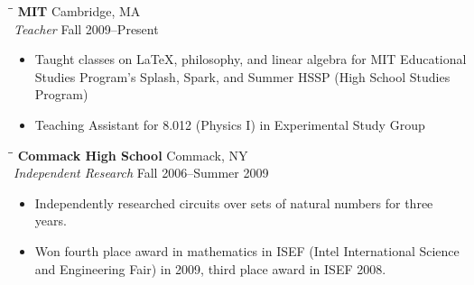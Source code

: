 \documentclass[11pt]{res}
\begin{document}
\begin{resume}
    
   \begin{tabbing}
   \hspace{2.3in}\= \hspace{2.6in}\= \kill %
    {\bf MIT} \>     \> Cambridge, MA \\
    \emph{Teacher} \>                         \>Fall 2009--Present
   \end{tabbing}%
   \begin{itemize}
      \item Taught classes on \LaTeX, philosophy, and linear algebra for MIT Educational Studies Program's Splash, Spark, and Summer HSSP (High School Studies Program)
      \item Teaching Assistant for 8.012 (Physics I) in Experimental Study Group
    \end{itemize}
   \begin{tabbing}
   \hspace{2.3in}\= \hspace{2.6in}\= \kill %
    {\bf Commack High School} \>     \>Commack, NY\\
    \emph{Independent Research} \>                         \>Fall 2006--Summer 2009
   \end{tabbing}%
   \begin{itemize}
      \item Independently researched circuits over sets of natural numbers for three years.
      \item Won fourth place award in mathematics in ISEF (Intel International Science and Engineering Fair) in 2009, third place award in ISEF 2008.
    \end{itemize}
    

\end{resume}
\end{document}
